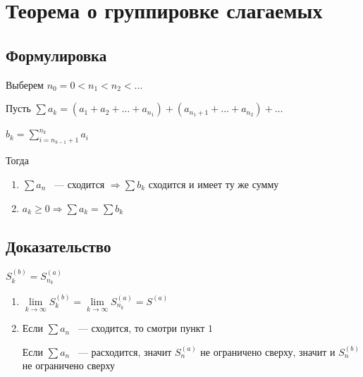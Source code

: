 \documentclass{article}
\begin{document}
        
    \newpage
    
    \section{Теорема о группировке слагаемых}
    
        \subsection{Формулировка}
        
            Выберем $n_0 = 0 < n_1 < n_2 < \ldots$
            
            Пусть $\sum a_k = (a_1 + a_2 + \ldots + a_{n_1}) + (a_{n_1 + 1} + \ldots + a_{n_2}) + \ldots$
            
            $b_k = \sum\limits^{n_k}_{i = n_{k - 1} + 1} a_i$
            
            Тогда
            
            \begin{enumerate}
            
                \item $\sum a_n$ ~--- сходится $\Rightarrow \sum b_k$ сходится и имеет ту же сумму
                
                \item $a_k \geq 0 \Rightarrow \sum a_k = \sum b_k$ 
                
            \end{enumerate}
            
        \subsection{Доказательство} 
            
            $S^{(b)}_k = S^{(a)}_{n_k}$
            
            \begin{enumerate}
            
                \item $\lim\limits_{k \rightarrow \infty} S^{(b)}_k = \lim\limits_{k \rightarrow \infty} S^{(a)}_{n_k} = S^{(a)}$
                
                \item Если $\sum a_n$ ~--- сходится, то смотри пункт $1$
                
                    Если $\sum a_n$ ~--- расходится, значит $S^{(a)}_n$ не ограничено сверху, значит и $S^{(b)}_n$ не ограничено сверху
            
            \end{enumerate}
            
\end{document}
